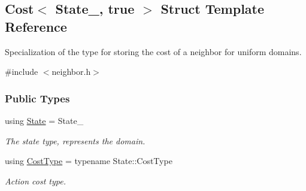 \hypertarget{structCost_3_01State___00_01true_01_4}{}\subsection{Cost$<$ State\+\_\+, true $>$ Struct Template Reference}
\label{structCost_3_01State___00_01true_01_4}


Specialization of the type for storing the cost of a neighbor for uniform domains.  




{\ttfamily \#include $<$neighbor.\+h$>$}

\subsubsection*{Public Types}
\begin{DoxyCompactItemize}
\item 
using \hyperlink{structCost_3_01State___00_01true_01_4_ad6d2eca98963076b0d43d13a6031b076}{State} = State\+\_\+\hypertarget{structCost_3_01State___00_01true_01_4_ad6d2eca98963076b0d43d13a6031b076}{}\label{structCost_3_01State___00_01true_01_4_ad6d2eca98963076b0d43d13a6031b076}

\begin{DoxyCompactList}\small\item\em The state type, represents the domain. \end{DoxyCompactList}\item 
using \hyperlink{structCost_3_01State___00_01true_01_4_ab4443fb7dc26647260e82934ca5d928b}{Cost\+Type} = typename State\+::\+Cost\+Type\hypertarget{structCost_3_01State___00_01true_01_4_ab4443fb7dc26647260e82934ca5d928b}{}\label{structCost_3_01State___00_01true_01_4_ab4443fb7dc26647260e82934ca5d928b}

\begin{DoxyCompactList}\small\item\em Action cost type. \end{DoxyCompactList}\end{DoxyCompactItemize}

